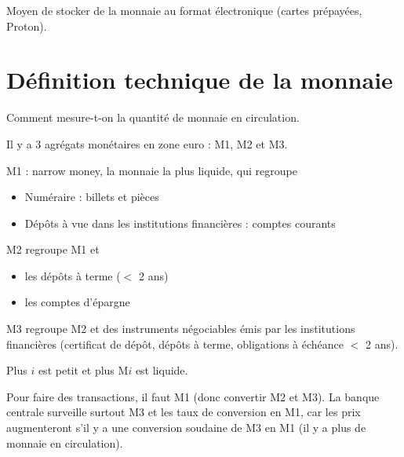 		Moyen de stocker de la monnaie au format électronique (cartes prépayées, Proton).
		
\section{Définition technique de la monnaie}

	Comment mesure-t-on la quantité de monnaie en circulation.
	
	Il y a 3 agrégats monétaires en zone euro : M1, M2 et M3.
	
	M1 : narrow money, la monnaie la plus liquide, qui regroupe
	
	\begin{itemize}
		\item Numéraire : billets et pièces
		\item Dépôts à vue dans les institutions financières : comptes courants
	\end{itemize}
	
	M2 regroupe M1 et
	
	\begin{itemize}
		\item les dépôts à terme ($<$ 2 ans)
		\item les comptes d'épargne
	\end{itemize}
	
	M3 regroupe M2 et des instruments négociables émis par les institutions financières (certificat de dépôt, dépôts à terme, obligations à échéance $<$ 2 ans).
	
	Plus $i$ est petit et plus M$i$ est liquide.
	
	Pour faire des transactions, il faut M1 (donc convertir M2 et M3). La banque centrale surveille surtout M3 et les taux de conversion en M1, car les prix augmenteront s'il y a une conversion soudaine de M3 en M1 (il y a plus de monnaie en circulation).
	
	